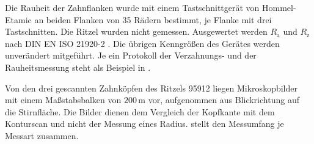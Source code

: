 Die Rauheit der Zahnflanken wurde mit einem Tastschnittgerät von Hommel-Etamic an beiden Flanken von 35 Rädern bestimmt, je Flanke mit drei Tastschnitten. Die Ritzel wurden nicht gemessen. Ausgewertet werden $R_{\mathrm{a}}$ und $R_{\mathrm{z}}$ nach DIN EN ISO 21920-2 \cite{DINENISO21920-2}. Die übrigen Kenngrößen des Gerätes werden unverändert mitgeführt. Je ein Protokoll der Verzahnungs- und der Rauheitsmessung steht als Beispiel in .

Von den drei gescannten Zahnköpfen des Ritzels 95912 liegen Mikroskopbilder mit einem Maßstabsbalken von $200$\,\textmu m vor, aufgenommen aus Blickrichtung auf die Stirnfläche. Die Bilder dienen dem Vergleich der Kopfkante mit dem Konturscan und nicht der Messung eines Radius.  stellt den Messumfang je Messart zusammen.


